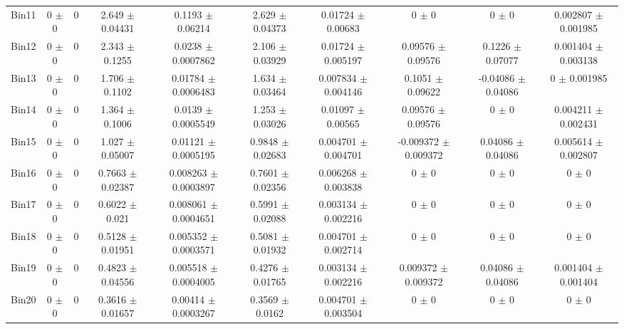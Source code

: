 \begin{tabular}{@{\extracolsep{4pt}}lccccccccc@{}}
     Bin11 & 0 $\pm$ 0 & 0 & 2.649 $\pm$ 0.04431 & 0.1193 $\pm$ 0.06214 & 2.629 $\pm$ 0.04373 & 0.01724 $\pm$ 0.00683 & 0 $\pm$ 0 & 0 $\pm$ 0 & 0.002807 $\pm$ 0.001985 \\ 
     Bin12 & 0 $\pm$ 0 & 0 & 2.343 $\pm$ 0.1255 & 0.0238 $\pm$ 0.0007862 & 2.106 $\pm$ 0.03929 & 0.01724 $\pm$ 0.005197 & 0.09576 $\pm$ 0.09576 & 0.1226 $\pm$ 0.07077 & 0.001404 $\pm$ 0.003138 \\ 
     Bin13 & 0 $\pm$ 0 & 0 & 1.706 $\pm$ 0.1102 & 0.01784 $\pm$ 0.0006483 & 1.634 $\pm$ 0.03464 & 0.007834 $\pm$ 0.004146 & 0.1051 $\pm$ 0.09622 & -0.04086 $\pm$ 0.04086 & 0 $\pm$ 0.001985 \\ 
     Bin14 & 0 $\pm$ 0 & 0 & 1.364 $\pm$ 0.1006 & 0.0139 $\pm$ 0.0005549 & 1.253 $\pm$ 0.03026 & 0.01097 $\pm$ 0.00565 & 0.09576 $\pm$ 0.09576 & 0 $\pm$ 0 & 0.004211 $\pm$ 0.002431 \\ 
     Bin15 & 0 $\pm$ 0 & 0 & 1.027 $\pm$ 0.05007 & 0.01121 $\pm$ 0.0005195 & 0.9848 $\pm$ 0.02683 & 0.004701 $\pm$ 0.004701 & -0.009372 $\pm$ 0.009372 & 0.04086 $\pm$ 0.04086 & 0.005614 $\pm$ 0.002807 \\ 
     Bin16 & 0 $\pm$ 0 & 0 & 0.7663 $\pm$ 0.02387 & 0.008263 $\pm$ 0.0003897 & 0.7601 $\pm$ 0.02356 & 0.006268 $\pm$ 0.003838 & 0 $\pm$ 0 & 0 $\pm$ 0 & 0 $\pm$ 0 \\ 
     Bin17 & 0 $\pm$ 0 & 0 & 0.6022 $\pm$ 0.021 & 0.008061 $\pm$ 0.0004651 & 0.5991 $\pm$ 0.02088 & 0.003134 $\pm$ 0.002216 & 0 $\pm$ 0 & 0 $\pm$ 0 & 0 $\pm$ 0 \\ 
     Bin18 & 0 $\pm$ 0 & 0 & 0.5128 $\pm$ 0.01951 & 0.005352 $\pm$ 0.0003571 & 0.5081 $\pm$ 0.01932 & 0.004701 $\pm$ 0.002714 & 0 $\pm$ 0 & 0 $\pm$ 0 & 0 $\pm$ 0 \\ 
     Bin19 & 0 $\pm$ 0 & 0 & 0.4823 $\pm$ 0.04556 & 0.005518 $\pm$ 0.0004005 & 0.4276 $\pm$ 0.01765 & 0.003134 $\pm$ 0.002216 & 0.009372 $\pm$ 0.009372 & 0.04086 $\pm$ 0.04086 & 0.001404 $\pm$ 0.001404 \\ 
     Bin20 & 0 $\pm$ 0 & 0 & 0.3616 $\pm$ 0.01657 & 0.00414 $\pm$ 0.0003267 & 0.3569 $\pm$ 0.0162 & 0.004701 $\pm$ 0.003504 & 0 $\pm$ 0 & 0 $\pm$ 0 & 0 $\pm$ 0 \\ 
\hline\hline
  \end{tabular}
